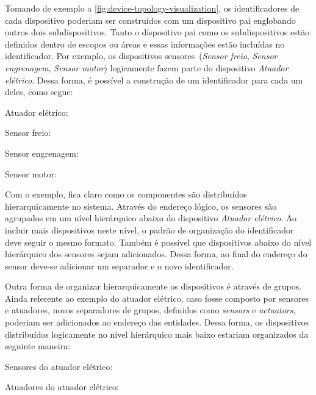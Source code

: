 Tomando de exemplo a \cref{fig:device-topology-visualization}, os identificadores de cada
dispositivo poderiam ser construídos com um dispositivo pai englobando outros dois subdispositivos.
Tanto o dispositivo pai como os subdispositivos estão definidos dentro de escopos ou áreas e essas
informações estão incluídas no identificador. Por exemplo, os dispositivos sensores~(\emph{Sensor
freio}, \emph{Sensor engrenagem}, \emph{Sensor motor}) logicamente fazem parte do dispositivo
\emph{Atuador elétrico}. Dessa forma, é possível a construção de um identificador para cada um
deles, como segue:

\begin{outline}
  \1 Atuador elétrico:

  \1 Sensor freio:

  \1 Sensor engrenagem:

  \1 Sensor motor:
\end{outline}

Com o exemplo, fica claro como os componentes são distribuídos hierarquicamente no sistema. Através
do endereço lógico, os sensores são agrupados em um nível hierárquico abaixo do dispositivo
\emph{Atuador elétrico}. Ao incluir mais dispositivos neste nível, o padrão de organização do
identificador deve seguir o mesmo formato. Também é possível que dispositivos abaixo do nível
hierárquico dos sensores sejam adicionados. Dessa forma, ao final do endereço do sensor deve-se
adicionar um separador e o novo identificador.

Outra forma de organizar hierarquicamente os dispositivos é através de grupos. Ainda referente ao
exemplo do atuador elétrico, caso fosse composto por sensores e atuadores, novos separadores de
grupos, definidos como \emph{sensors} e \emph{actuators}, poderiam ser adicionados ao endereço das
entidades. Dessa forma, os dispositivos distribuídos logicamente no nível hierárquico mais baixo
estariam organizados da seguinte maneira:

\begin{outline}
  \1 Sensores do atuador elétrico:

  \1 Atuadores do atuador elétrico:
\end{outline}

